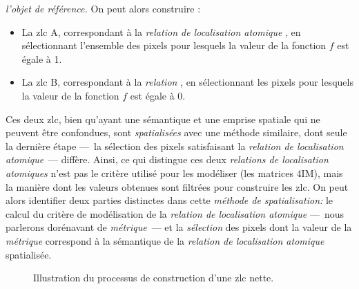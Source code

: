 \emph{l'objet de référence.} On peut alors construire :
% 
\begin{itemize}
\item La \ac{zlc} \textcolor{RdBu-9-1}{\textsf{A}}, correspondant à la
  \emph{relation de localisation atomique}
  , en sélectionnant l'ensemble des pixels
  pour lesquels la valeur de la fonction \(f\) est égale à 1.
\item La \ac{zlc} \textcolor{RdBu-9-9}{\textsf{B}}, correspondant à la
  \emph{relation} , en sélectionnant les
  pixels pour lesquels la valeur de la fonction \(f\) est égale à 0.
\end{itemize}
%
Ces deux \ac{zlc}, bien qu'ayant une sémantique et une emprise
spatiale qui ne peuvent être confondues, sont \emph{spatialisées} avec
une méthode similaire, dont seule la dernière étape ---~la sélection
des pixels satisfaisant la \emph{relation de localisation
  atomique}~--- diffère.  Ainsi, ce qui distingue ces deux
\emph{relations de localisation atomiques} n'est pas le critère
utilisé pour les modéliser (\ie les matrices 4IM), mais la manière
dont les valeurs obtenues sont filtrées pour construire les
\ac{zlc}. On peut alors identifier deux parties distinctes dans cette
\emph{méthode de spatialisation:} le calcul du critère de modélisation
de la \emph{relation de localisation atomique} ---~nous parlerons
dorénavant de \emph{métrique}~--- et la \emph{sélection} des pixels
dont la valeur de la \emph{métrique} correspond à la sémantique de la
\emph{relation de localisation atomique} spatialisée.

\begin{figure}
  \centering
  
  \caption{Illustration du processus de construction d'une \ac{zlc}
    nette.}
  \label{fig:Exemple_Metrique_vs_Selecteur}
\end{figure}

